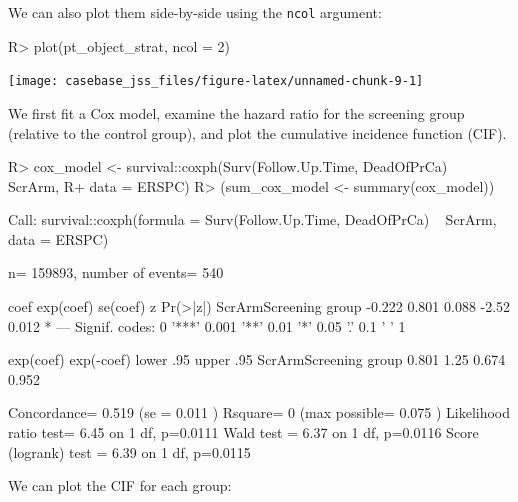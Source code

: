 \documentclass[article]{jss}
\begin{document}
We can also plot them side-by-side using the \texttt{ncol} argument:

\begin{CodeChunk}

\begin{CodeInput}
R> plot(pt_object_strat, ncol = 2)
\end{CodeInput}


\begin{center}\texttt{[image: casebase\_jss\_files/figure-latex/unnamed-chunk-9-1]} \end{center}

\end{CodeChunk}

We first fit a Cox model, examine the hazard ratio for the screening
group (relative to the control group), and plot the cumulative incidence
function (CIF).

\begin{CodeChunk}

\begin{CodeInput}
R> cox_model <- survival::coxph(Surv(Follow.Up.Time, DeadOfPrCa) ~ ScrArm, 
R+                              data = ERSPC)
R> (sum_cox_model <- summary(cox_model))
\end{CodeInput}

\begin{CodeOutput}
Call:
survival::coxph(formula = Surv(Follow.Up.Time, DeadOfPrCa) ~ 
    ScrArm, data = ERSPC)

  n= 159893, number of events= 540 

                        coef exp(coef) se(coef)     z Pr(>|z|)  
ScrArmScreening group -0.222     0.801    0.088 -2.52    0.012 *
---
Signif. codes:  0 '***' 0.001 '**' 0.01 '*' 0.05 '.' 0.1 ' ' 1

                      exp(coef) exp(-coef) lower .95 upper .95
ScrArmScreening group     0.801       1.25     0.674     0.952

Concordance= 0.519  (se = 0.011 )
Rsquare= 0   (max possible= 0.075 )
Likelihood ratio test= 6.45  on 1 df,   p=0.0111
Wald test            = 6.37  on 1 df,   p=0.0116
Score (logrank) test = 6.39  on 1 df,   p=0.0115
\end{CodeOutput}
\end{CodeChunk}

We can plot the CIF for each group:
\end{document}
